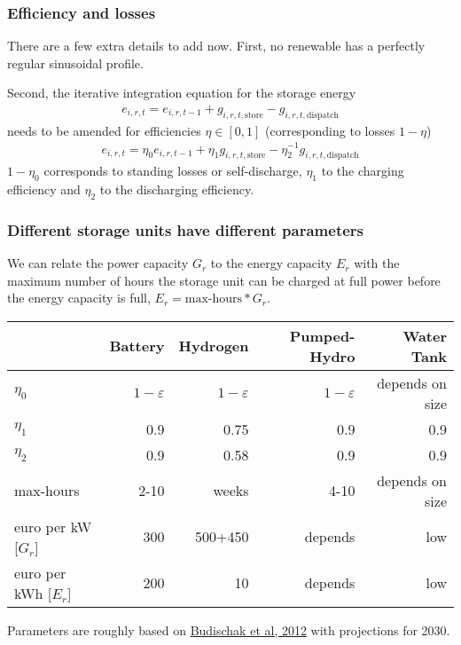 \documentclass[10pt,aspectratio=169,dvipsnames]{beamer}
\newcommand{\ra}[1]{\renewcommand{\arraystretch}{#1}}
\begin{document}
\begin{frame}
  \frametitle{Efficiency and losses}

  There are a few extra details to add now. First, no renewable has a perfectly regular sinusoidal profile.

  Second, the iterative integration equation for the storage energy
  \begin{align*}
    e_{i,r,t} = e_{i,r,t-1} + g_{i,r,t,\textrm{store}} -  g_{i,r,t,\textrm{dispatch}}
  \end{align*}
  needs to be amended for \alert{efficiencies} $\eta\in [0,1]$ (corresponding to \alert{losses} $1-\eta$)
  \begin{align*}
    e_{i,r,t} = \eta_0e_{i,r,t-1} + \eta_1g_{i,r,t,\textrm{store}} -  \eta_2^{-1} g_{i,r,t,\textrm{dispatch}}
  \end{align*}
  $1-\eta_0$ corresponds to \alert{standing losses} or \alert{self-discharge}, $\eta_1$ to the \alert{charging efficiency} and $\eta_2$ to the \alert{discharging efficiency}.

\end{frame}


\begin{frame}
  \frametitle{Different storage units have different parameters}

  We can relate the power capacity $G_r$ to the energy capacity $E_r$
  with the maximum number of hours the storage unit can be charged at full
power before the energy capacity is full, $E_r =
  \textrm{max-hours}*G_r$.

  \ra{1.05}
  \begin{table}[!t]
    \begin{tabular}{lrrrr}
      \toprule
      & Battery & Hydrogen & Pumped-Hydro & Water Tank\\
      \midrule
      $\eta_0$ & $1-\varepsilon$ & $1-\varepsilon$ & $1-\varepsilon$ & depends on size  \\
      $\eta_1$ & 0.9 & 0.75 & 0.9 & 0.9 \\
      $\eta_2$ & 0.9 & 0.58 & 0.9 & 0.9 \\
      max-hours & 2-10 & weeks & 4-10 & depends on size \\
      euro per kW [$G_r$] &300 &500+450 & depends& low \\
      euro per kWh [$E_r$] &200 & 10 &depends&low \\
      \bottomrule
    \end{tabular}
  \end{table}
Parameters are roughly based on
\href{http://www.sciencedirect.com/science/article/pii/S0378775312014759}{Budischak
  et al, 2012} with projections for 2030.


\end{frame}
\end{document}
